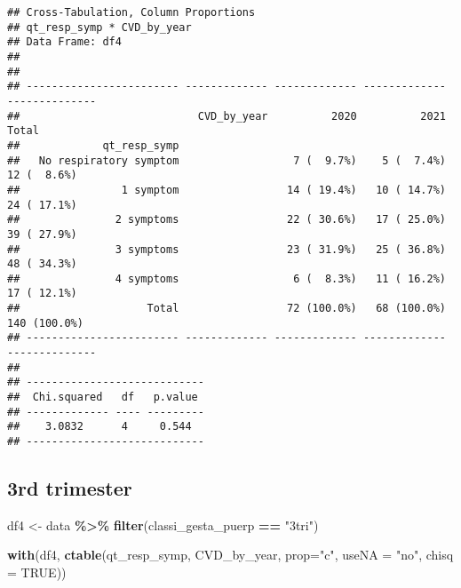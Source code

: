 \documentclass[
]{article}
\newenvironment{Shaded}{\begin{snugshade}}{\end{snugshade}}
\newcommand{\AttributeTok}[1]{\textcolor[rgb]{0.13,0.29,0.53}{#1}}
\newcommand{\ConstantTok}[1]{\textcolor[rgb]{0.56,0.35,0.01}{#1}}
\newcommand{\FunctionTok}[1]{\textcolor[rgb]{0.13,0.29,0.53}{\textbf{#1}}}
\newcommand{\NormalTok}[1]{#1}
\newcommand{\OtherTok}[1]{\textcolor[rgb]{0.56,0.35,0.01}{#1}}
\newcommand{\SpecialCharTok}[1]{\textcolor[rgb]{0.81,0.36,0.00}{\textbf{#1}}}
\newcommand{\StringTok}[1]{\textcolor[rgb]{0.31,0.60,0.02}{#1}}
\begin{document}
\begin{verbatim}
## Cross-Tabulation, Column Proportions  
## qt_resp_symp * CVD_by_year  
## Data Frame: df4  
## 
## 
## ------------------------ ------------- ------------- ------------- --------------
##                            CVD_by_year          2020          2021          Total
##             qt_resp_symp                                                         
##   No respiratory symptom                  7 (  9.7%)    5 (  7.4%)    12 (  8.6%)
##                1 symptom                 14 ( 19.4%)   10 ( 14.7%)    24 ( 17.1%)
##               2 symptoms                 22 ( 30.6%)   17 ( 25.0%)    39 ( 27.9%)
##               3 symptoms                 23 ( 31.9%)   25 ( 36.8%)    48 ( 34.3%)
##               4 symptoms                  6 (  8.3%)   11 ( 16.2%)    17 ( 12.1%)
##                    Total                 72 (100.0%)   68 (100.0%)   140 (100.0%)
## ------------------------ ------------- ------------- ------------- --------------
## 
## ----------------------------
##  Chi.squared   df   p.value 
## ------------- ---- ---------
##    3.0832      4     0.544  
## ----------------------------
\end{verbatim}

\hypertarget{rd-trimester-4}{%
\subsection{3rd trimester}\label{rd-trimester-4}}

\begin{Shaded}
\begin{Highlighting}[]
\NormalTok{df4 }\OtherTok{\textless{}{-}}\NormalTok{ data }\SpecialCharTok{\%\textgreater{}\%} 
  \FunctionTok{filter}\NormalTok{(classi\_gesta\_puerp }\SpecialCharTok{==} \StringTok{"3tri"}\NormalTok{)}

\FunctionTok{with}\NormalTok{(df4, }\FunctionTok{ctable}\NormalTok{(qt\_resp\_symp, CVD\_by\_year, }\AttributeTok{prop=}\StringTok{"c"}\NormalTok{, }\AttributeTok{useNA =} \StringTok{"no"}\NormalTok{, }\AttributeTok{chisq =} \ConstantTok{TRUE}\NormalTok{))}
\end{Highlighting}
\end{Shaded}
\end{document}
